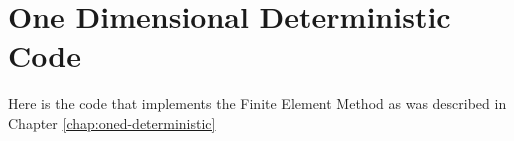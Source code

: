 \chapter{One Dimensional Deterministic Code}\label{app:oned-deterministic-code}

Here is the code that implements the Finite Element Method as was described in
Chapter \ref{chap:oned-deterministic}

